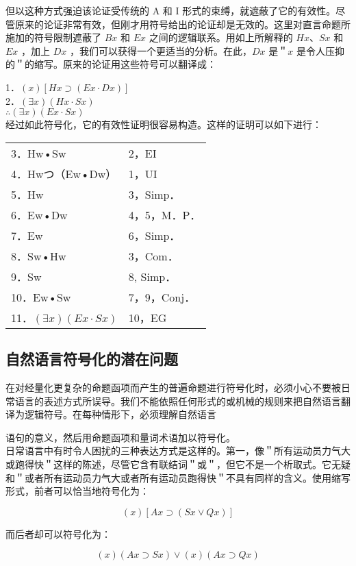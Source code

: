 但以这种方式强迫该论证受传统的 A 和 I 形式的束缚，就遮蔽了它的有效性。尽管原来的论证非常有效，但刚才用符号给出的论证却是无效的。这里对直言命题所施加的符号限制遮蔽了 $B x$ 和 $E x$ 之间的逻辑联系。用如上所解释的 $H x 、 S x$ 和 $E x$ ，加上 $D x$ ，我们可以获得一个更适当的分析。在此，$D x$ 是＂$x$ 是令人压抑的＂的缩写。原来的论证用这些符号可以翻译成：

1．$(x)[H x \supset(E x \cdot D x)]$\\
2．$(\exists x)(H x \cdot S x)$\\
$\therefore(\exists x)(E x \cdot S x)$\\
经过如此符号化，它的有效性证明很容易构造。这样的证明可以如下进行：

\begin{center}
\begin{tabular}{ll}
3．Hw•Sw & 2，EI \\
4．Hwつ（Ew•Dw） & 1，UI \\
5．Hw & 3，Simp． \\
6．Ew•Dw & 4，5，M．P． \\
7．Ew & 6，Simp． \\
8．Sw•Hw & 3，Com． \\
9．Sw & 8, Simp． \\
10．Ew•Sw & 7，9，Conj． \\
11．$(\exists x)(E x \cdot S x)$ & 10，EG \\
\end{tabular}
\end{center}

\subsection{自然语言符号化的潜在问题}

在对经量化更复杂的命题函项而产生的普遍命题进行符号化时，必须小心不要被日常语言的表述方式所误导。我们不能依照任何形式的或机械的规则来把自然语言翻译为逻辑符号。在每种情形下，必须理解自然语言

语句的意义，然后用命题函项和量词术语加以符号化。\\
日常语言中有时令人困扰的三种表达方式是这样的。第一，像＂所有运动员力气大或跑得快＂这样的陈述，尽管它含有联结词＂或＂，但它不是一个析取式。它无疑和＂或者所有运动员力气大或者所有运动员跑得快＂不具有同样的含义。使用缩写形式，前者可以恰当地符号化为：

$$
(x)[A x \supset(S x \vee Q x)]
$$

而后者却可以符号化为：

$$
(x)(A x \supset S x) \vee(x)(A x \supset Q x)
$$

